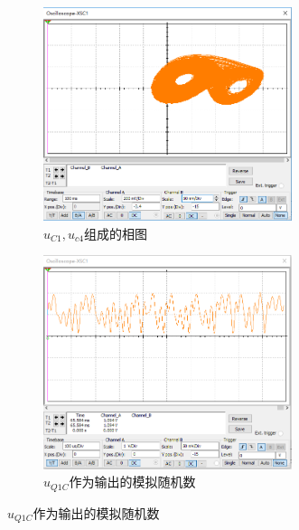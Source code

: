 \documentclass[a4paper, 11pt]{article} %
\begin{document}
\begin{figure}[H]
  \centering
  \begin{minipage}[H]{0.45\textwidth}
    \begin{figure}[H]
      \centering
      \includegraphics[width = 0.8\textwidth]{chaos_phase.png}
      \caption{$u_{C1}, u_{c4}$组成的相图}
    \end{figure}
  \end{minipage}
  \begin{minipage}[H]{0.45\textwidth}
    \begin{figure}[H]
      \centering
      \includegraphics[width = 0.8\textwidth]{chaos_output.png}
      \caption{$u_{Q1C}$作为输出的模拟随机数}
    \end{figure}
  \end{minipage}
\end{figure}
\end{document}
